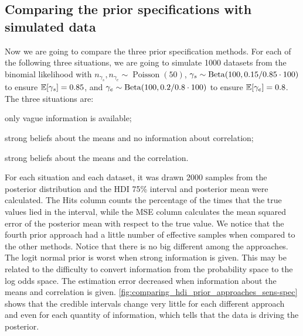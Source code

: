 \subsection{Comparing the prior specifications with simulated data}

Now we are going to compare the three prior specification methods. For each of
the following three situations, we are going to simulate 1000 datasets from
the binomial likelihood with $n_{\gamma_s}, n_{\gamma_e} \sim
\operatorname{Poisson}(50)$, $\gamma_s \sim \operatorname{Beta}(100, 0.15/0.85 \cdot
100)$ to ensure $\mathbb{E}[\gamma_s] = 0.85$, and  $\gamma_e \sim \operatorname{Beta}(100, 0.2/0.8 \cdot
100)$ to ensure $\mathbb{E}[\gamma_e] = 0.8$. The three situations are: 

\begin{alineas}
  \item \label{item:vague-information-sensitivity-specificity} only vague information is available; 
  \item \label{item:strong-mean-sensitivity-specificity} strong beliefs about the means and no information about correlation; 
  \item\label{item:strong-mean-cor-information-sensitivity-specificity}  strong beliefs about the means and the correlation. 
\end{alineas}

For each situation and each dataset, it was drawn 2000 samples from the
posterior distribution and the HDI 75\% interval and posterior mean were calculated. The Hits
column counts the percentage of the times that the true values lied in the
interval, while the MSE column calculates the mean squared error of the
posterior mean with respect to the true value. We notice that the fourth prior
approach had a little number of effective samples when compared to the other
methods.  Notice that there is no big different among the approaches. The
logit normal prior is worst when strong information is given. This may be
related to the difficulty to convert information from the probability space to
the log odds space. The estimation error decreased when information about the 
means and correlation is given.
\autoref{fig:comparing_hdi_prior_approaches_sens-spec} 
shows that the credible intervals change very little for each different
approach and even for each quantity of information, which tells that the data 
is driving the posterior. 

